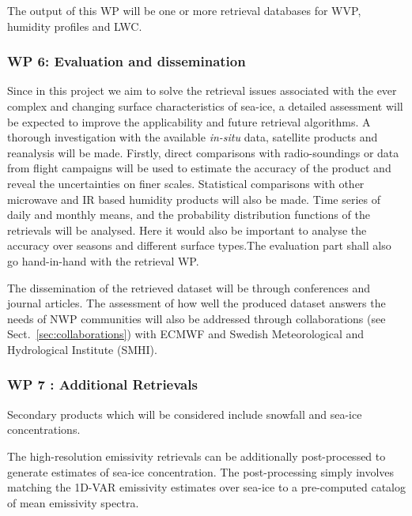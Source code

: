 \documentclass[12pt,oneside,a4paper]{article}
\begin{document}
The output of this WP will be one or more retrieval databases for WVP, humidity profiles and LWC.
\vspace{-1.0ex}
\subsubsection*{WP 6: Evaluation and dissemination}
%
\label{sec:evaluation}
Since in this project we aim to solve the retrieval issues associated with the
ever complex and changing surface characteristics of sea-ice, a detailed
assessment will be expected to improve the applicability and future retrieval
algorithms. A thorough investigation with the available \textit{in-situ} data,
satellite products and reanalysis will be made. Firstly, direct comparisons
with radio-soundings or data from flight campaigns will be used to estimate the
accuracy of the product and reveal the uncertainties on finer scales.
Statistical comparisons with other microwave and IR based humidity products
will also be made. Time series of daily and monthly means, and the probability
distribution functions of the retrievals will be analysed. Here it would also
be important to analyse the accuracy over seasons and different surface
types.The evaluation part shall also go hand-in-hand with the retrieval WP.

The dissemination of the retrieved dataset will be through conferences and journal articles. The assessment of how well the produced dataset answers the needs of NWP communities will also be addressed through collaborations (see Sect.~\ref{sec:collaborations}) with ECMWF and Swedish Meteorological and Hydrological Institute (SMHI). 
\vspace{-1.0ex}
\subsubsection*{WP 7 : Additional Retrievals}
%
\label{sec:other_retrievals}

Secondary products which will be considered include snowfall and sea-ice concentrations.  


The high-resolution emissivity retrievals can be additionally post-processed to generate estimates of sea-ice concentration. The post-processing simply involves matching the 1D-VAR emissivity estimates over sea-ice to a pre-computed catalog of mean emissivity spectra. %
\end{document}
